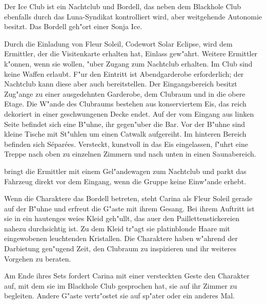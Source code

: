 


Der Ice Club ist ein Nachtclub und Bordell, das neben dem Blackhole Club ebenfalls durch das Luna-Syndikat kontrolliert wird, aber weitgehende Autonomie besitzt. Das Bordell geh"ort einer Sonja Ice. 

Durch die Einladung von Fleur Soleil, Codewort Solar Eclipse, wird dem Ermittler, der die Visitenkarte erhalten hat, Einlass gew"ahrt. Weitere Ermittler k"onnen, wenn sie wollen, "uber \xl{} Zugang zum Nachtclub erhalten. Im Club sind keine Waffen erlaubt. F"ur den Eintritt ist Abendgarderobe erforderlich; der Nachtclub kann diese aber auch bereitstellen. Der Eingangsbereich besitzt Zug"ange zu einer ausgedehnten Garderobe, dem Clubraum und in die obere Etage. Die W"ande des Clubraums bestehen aus konserviertem Eis, das reich dekoriert in einer geschwungenen Decke endet. Auf der vom Eingang aus linken Seite befindet sich eine B"uhne, ihr gegen"uber die Bar. Vor der B"uhne sind kleine Tische mit St"uhlen um einen Catwalk aufgereiht. Im hinteren Bereich befinden sich S\'epar\'ees. Versteckt, kunstvoll in das Eis eingelassen, f"uhrt eine Treppe nach oben zu einzelnen Zimmern und nach unten in einen Saunabereich.

\xl{} bringt die Ermittler mit einem Gel"andewagen zum Nachtclub und parkt das Fahrzeug direkt vor dem Eingang, wenn die Gruppe keine Einw"ande erhebt.

Wenn die Charaktere das Bordell betreten, steht Carina als Fleur Soleil gerade auf der B"uhne und erfreut die G"aste mit ihrem Gesang. Bei ihrem Auftritt ist sie in ein hautenges wei\3es Kleid geh"ullt, das au\3er den Paillettenstickereien nahezu durchsichtig ist. Zu dem Kleid tr"agt sie platinblonde Haare mit eingewobenen leuchtenden Kristallen. Die Charaktere haben w"ahrend der Darbietung gen"ugend Zeit, den Clubraum zu inspizieren und ihr weiteres Vorgehen zu beraten.

Am Ende ihres Sets fordert Carina mit einer versteckten Geste den Charakter auf, mit dem sie im Blackhole Club gesprochen hat, sie auf ihr Zimmer zu begleiten. Andere G"aste vertr"ostet sie auf sp"ater oder ein anderes Mal.

